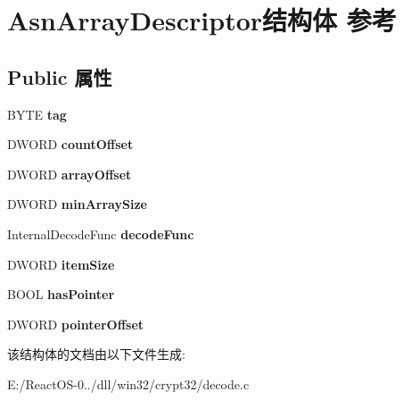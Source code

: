 \hypertarget{struct_asn_array_descriptor}{}\section{Asn\+Array\+Descriptor结构体 参考}
\label{struct_asn_array_descriptor}
\subsection*{Public 属性}
\begin{DoxyCompactItemize}
\item 
\mbox{\label{struct_asn_array_descriptor_a00f263334b4e81a4474b3b346dc64a69}} 
B\+Y\+TE {\bfseries tag}
\item 
\mbox{\label{struct_asn_array_descriptor_a937566cb1f6d7306f306039ef26c4df1}} 
D\+W\+O\+RD {\bfseries count\+Offset}
\item 
\mbox{\label{struct_asn_array_descriptor_a7337cdba10395af1519195c47b45c110}} 
D\+W\+O\+RD {\bfseries array\+Offset}
\item 
\mbox{\label{struct_asn_array_descriptor_a8d388fd81efdfea53f35c22a3bcd3347}} 
D\+W\+O\+RD {\bfseries min\+Array\+Size}
\item 
\mbox{\label{struct_asn_array_descriptor_aee364149d83bef56acf54316e72aa8e3}} 
Internal\+Decode\+Func {\bfseries decode\+Func}
\item 
\mbox{\label{struct_asn_array_descriptor_a661b52856c4a0b8690e9448eda1aa119}} 
D\+W\+O\+RD {\bfseries item\+Size}
\item 
\mbox{\label{struct_asn_array_descriptor_a595accd0cca6e4d0ff06b31826653557}} 
B\+O\+OL {\bfseries has\+Pointer}
\item 
\mbox{\label{struct_asn_array_descriptor_a14fa1d8862081cf3632340caf3d0dd65}} 
D\+W\+O\+RD {\bfseries pointer\+Offset}
\end{DoxyCompactItemize}


该结构体的文档由以下文件生成\+:\begin{DoxyCompactItemize}
\item 
E\+:/\+React\+O\+S-\/0../dll/win32/crypt32/decode.\+c\end{DoxyCompactItemize}
